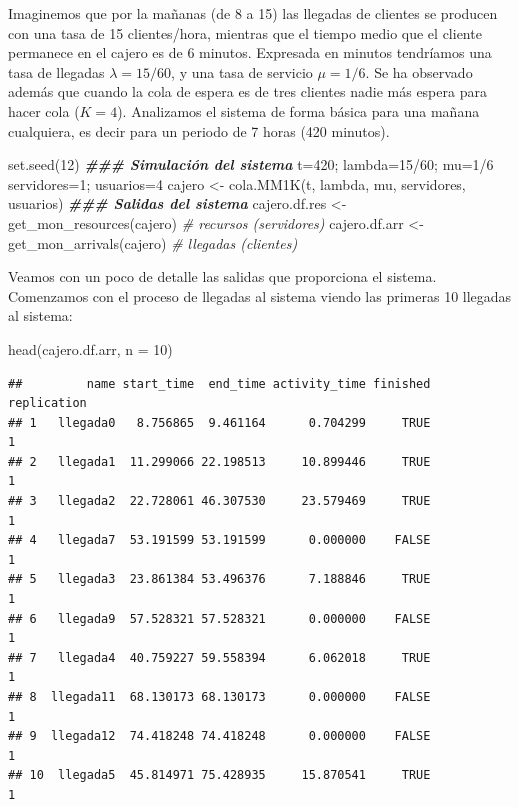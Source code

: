 \documentclass[
]{book}
\newenvironment{Shaded}{\begin{snugshade}}{\end{snugshade}}
\newcommand{\AttributeTok}[1]{\textcolor[rgb]{0.77,0.63,0.00}{#1}}
\newcommand{\CommentTok}[1]{\textcolor[rgb]{0.56,0.35,0.01}{\textit{#1}}}
\newcommand{\DecValTok}[1]{\textcolor[rgb]{0.00,0.00,0.81}{#1}}
\newcommand{\DocumentationTok}[1]{\textcolor[rgb]{0.56,0.35,0.01}{\textbf{\textit{#1}}}}
\newcommand{\FunctionTok}[1]{\textcolor[rgb]{0.00,0.00,0.00}{#1}}
\newcommand{\NormalTok}[1]{#1}
\newcommand{\OtherTok}[1]{\textcolor[rgb]{0.56,0.35,0.01}{#1}}
\newcommand{\SpecialCharTok}[1]{\textcolor[rgb]{0.00,0.00,0.00}{#1}}
\theoremstyle{definition}
\theoremstyle{definition}
\theoremstyle{definition}
\theoremstyle{definition}
\theoremstyle{remark}
\begin{document}
Imaginemos que por la mañanas (de 8 a 15) las llegadas de clientes se producen con una tasa de 15 clientes/hora, mientras que el tiempo medio que el cliente permanece en el cajero es de 6 minutos. Expresada en minutos tendríamos una tasa de llegadas \(\lambda = 15/60\), y una tasa de servicio \(\mu = 1/6\). Se ha observado además que cuando la cola de espera es de tres clientes nadie más espera para hacer cola (\(K = 4\)). Analizamos el sistema de forma básica para una mañana cualquiera, es decir para un periodo de 7 horas (420 minutos).

\begin{Shaded}
\begin{Highlighting}[]
\FunctionTok{set.seed}\NormalTok{(}\DecValTok{12}\NormalTok{)}
\DocumentationTok{\#\#\# Simulación del sistema}
\NormalTok{t}\OtherTok{=}\DecValTok{420}\NormalTok{; }
\NormalTok{lambda}\OtherTok{=}\DecValTok{15}\SpecialCharTok{/}\DecValTok{60}\NormalTok{; mu}\OtherTok{=}\DecValTok{1}\SpecialCharTok{/}\DecValTok{6}
\NormalTok{servidores}\OtherTok{=}\DecValTok{1}\NormalTok{; usuarios}\OtherTok{=}\DecValTok{4}
\NormalTok{cajero }\OtherTok{\textless{}{-}} \FunctionTok{cola.MM1K}\NormalTok{(t, lambda, mu, servidores, usuarios)}
\DocumentationTok{\#\#\# Salidas del sistema}
\NormalTok{cajero.df.res }\OtherTok{\textless{}{-}} \FunctionTok{get\_mon\_resources}\NormalTok{(cajero)  }\CommentTok{\# recursos (servidores)}
\NormalTok{cajero.df.arr }\OtherTok{\textless{}{-}} \FunctionTok{get\_mon\_arrivals}\NormalTok{(cajero)   }\CommentTok{\# llegadas (clientes)}
\end{Highlighting}
\end{Shaded}

Veamos con un poco de detalle las salidas que proporciona el sistema. Comenzamos con el proceso de llegadas al sistema viendo las primeras 10 llegadas al sistema:

\begin{Shaded}
\begin{Highlighting}[]
\FunctionTok{head}\NormalTok{(cajero.df.arr, }\AttributeTok{n =} \DecValTok{10}\NormalTok{)}
\end{Highlighting}
\end{Shaded}

\begin{verbatim}
##         name start_time  end_time activity_time finished replication
## 1   llegada0   8.756865  9.461164      0.704299     TRUE           1
## 2   llegada1  11.299066 22.198513     10.899446     TRUE           1
## 3   llegada2  22.728061 46.307530     23.579469     TRUE           1
## 4   llegada7  53.191599 53.191599      0.000000    FALSE           1
## 5   llegada3  23.861384 53.496376      7.188846     TRUE           1
## 6   llegada9  57.528321 57.528321      0.000000    FALSE           1
## 7   llegada4  40.759227 59.558394      6.062018     TRUE           1
## 8  llegada11  68.130173 68.130173      0.000000    FALSE           1
## 9  llegada12  74.418248 74.418248      0.000000    FALSE           1
## 10  llegada5  45.814971 75.428935     15.870541     TRUE           1
\end{verbatim}
\end{document}
